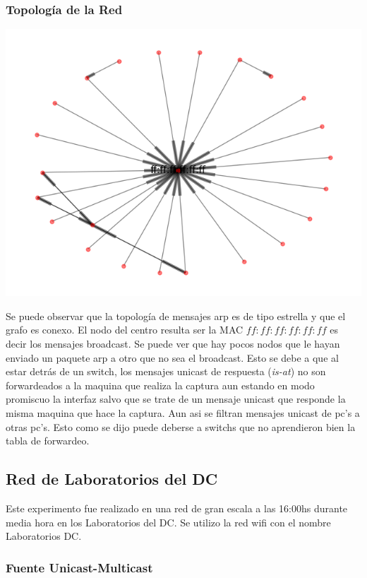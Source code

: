 \subsubsection{Topolog\'ia de la Red}
\begin{center}
 \includegraphics[scale=0.6]{../plots/trabajo_s2_topologia.png}
\end{center}

Se puede observar que la topología de mensajes arp es de tipo estrella
y que el grafo es conexo. El nodo del centro resulta ser la MAC $ff:ff:ff:ff:ff:ff$
es decir los mensajes broadcast. Se puede ver que hay pocos nodos que le hayan
enviado un paquete arp a otro que no sea el broadcast. Esto se debe
a que al estar detrás de un switch, los mensajes unicast de respuesta (\textit{is-at})
no son forwardeados a la maquina que realiza la captura aun estando en modo promiscuo
la interfaz salvo que se trate de un mensaje unicast que responde la misma maquina que
hace la captura. Aun asi se filtran mensajes unicast de pc's a otras pc's. Esto como
se dijo puede deberse a switchs que no aprendieron bien la tabla de forwardeo.

\subsection{Red de Laboratorios del DC}

Este experimento fue realizado en una red de gran escala a las 16:00hs durante media hora en los Laboratorios del DC.
Se utilizo la red wifi con el nombre Laboratorios DC.

\subsubsection{Fuente Unicast-Multicast}

